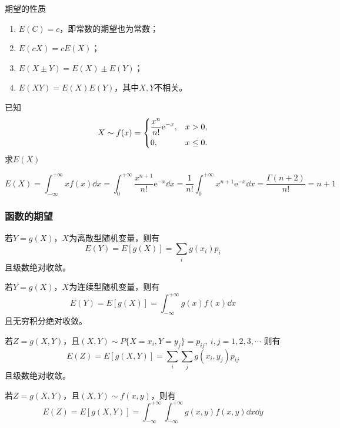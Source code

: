 期望的性质
\begin{enumerate}[(1)]
    \item $E(C)=c$，即常数的期望也为常数；
    \item $E(cX) = cE(X)$；
    \item $E(X\pm Y)=E(X)\pm E(Y)$；
    \item $E(XY)=E(X)E(Y)$，其中$X,Y$不相关。
\end{enumerate}

\begin{example}
    已知
    \[
        X \sim f(x) =
        \begin{dcases}
            \frac{x^n}{n!}\mathrm{e}^{-x}, & x>0,     \\
            0,                             & x\leq 0.
        \end{dcases}
    \]
    求$E(X)$
\end{example}
\begin{solution}
    \[
        E(X) = \int_{-\infty}^{+\infty} xf(x)\dd{x}
        =\int_0^{+\infty} \frac{x^{n+1}}{n!}\mathrm{e}^{-x}\dd{x}
        =\frac{1}{n!}\int_0^{+\infty} x^{n+1}\mathrm{e}^{-x}\dd{x}
        =\frac{\Gamma(n+2)}{n!} = n+1
    \]
\end{solution}

\subsubsection{函数的期望}
若$Y=g(X)$，$X$为离散型随机变量，则有
\begin{equation}
    E(Y)=E[g(X)] = \sum_{i} g(x_i)p_i
\end{equation}
且级数绝对收敛。

若$Y=g(X)$，$X$为连续型随机变量，则有
\begin{equation}
    E(Y)=E[g(X)] = \int_{-\infty}^{+\infty} g(x)f(x)\dd{x}
\end{equation}
且无穷积分绝对收敛。

若$Z=g(X,Y)$，且$(X,Y)\sim P\{X=x_i,Y=y_j\}=p_{ij},\  i,j=1,2,3,\cdots$
则有
\begin{equation}
    E(Z) = E[g(X,Y)] = \sum_i \sum_j g(x_i,y_j)p_{ij}
\end{equation}
且级数绝对收敛。

若$Z=g(X,Y)$，且$(X,Y)\sim f(x,y)$，则有
\begin{equation}
    E(Z) = E[g(X,Y)] = \int_{-\infty}^{+\infty} \int_{-\infty}^{+\infty} g(x,y)f(x,y)\dd{x}\dd{y}
\end{equation}

